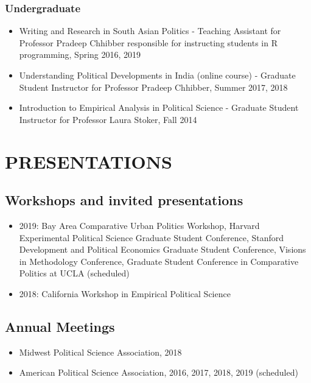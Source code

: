 \documentclass[11pt]{article}
\begin{document}
\subsubsection*{Undergraduate}
\begin{itemize}
		\item[]Writing and Research in South Asian Politics - Teaching Assistant for Professor Pradeep Chhibber responsible for instructing students in \textsf{R} programming, Spring 2016, 2019
	\item[]Understanding Political Developments in India (online course) - Graduate Student Instructor for Professor Pradeep Chhibber, Summer 2017, 2018
	\item[]Introduction to Empirical Analysis in Political Science - Graduate Student Instructor for Professor Laura Stoker, Fall 2014	
\end{itemize}


\section*{PRESENTATIONS}
\subsection*{Workshops and invited presentations}
\begin{itemize}
\item[] 2019: Bay Area Comparative Urban Politics Workshop, Harvard Experimental Political Science Graduate Student Conference, Stanford Development and Political Economics Graduate Student Conference, Visions in Methodology Conference, Graduate Student Conference in Comparative Politics at UCLA (scheduled)


\item[] 2018: California Workshop in Empirical Political Science
\end{itemize}
\subsection*{Annual Meetings}

\begin{itemize}
\item[]Midwest Political Science Association, 2018
	\item[]American Political Science Association, 2016, 2017, 2018, 2019 (scheduled)
	
	
	
\end{itemize}
\end{document}
